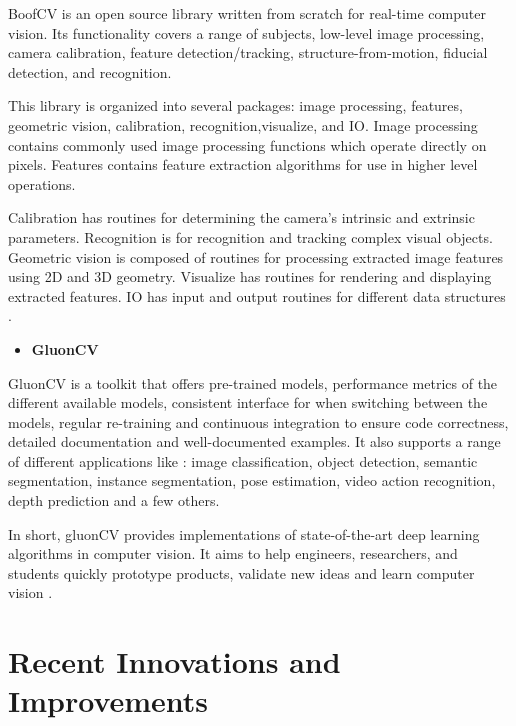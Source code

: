    BoofCV is an open source library written from scratch for real-time computer vision. Its functionality covers a range of subjects, low-level image processing, camera calibration, feature detection/tracking, structure-from-motion, fiducial detection, and recognition. \par
	This library is organized into several packages: image processing, features, geometric vision, calibration, recognition,visualize, and IO. Image processing contains commonly used image processing functions which operate directly on pixels. Features contains feature extraction algorithms for use in higher level operations. \par Calibration has routines for determining the camera's intrinsic and extrinsic parameters. Recognition is for recognition and tracking complex visual objects. Geometric vision is composed of routines for processing extracted image features using 2D and 3D geometry. Visualize has routines for rendering and displaying extracted features. IO has input and output routines for different data structures \cite{boofcvweb}.

    \begin{itemize}
        \item \textbf{GluonCV}
    \end{itemize}

    GluonCV is a toolkit that offers pre-trained models, performance metrics of the different available models, consistent interface for when switching between the models, regular re-training and continuous integration to ensure code correctness, detailed documentation and well-documented examples. It also supports a range of different applications like : image classification, object detection, semantic segmentation, instance segmentation, pose estimation, video action recognition, depth prediction and a few others.

   In short, gluonCV provides implementations of state-of-the-art deep learning algorithms in computer vision. It aims to help engineers, researchers, and students quickly prototype products, validate new ideas and learn computer vision \cite{Guo2019}.

    

    


\section{Recent Innovations and Improvements}
\label{sec:state}

